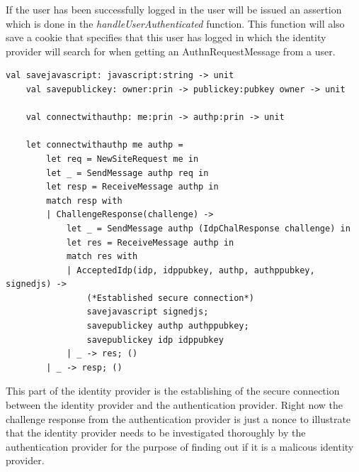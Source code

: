 \documentclass[twosided]{report}
\begin{document}
If the user has been successfully logged in the user will be issued an assertion which is done in the \emph{handleUserAuthenticated} function. This function will also save a cookie that specifies that this user has logged in which the identity provider will search for when getting an AuthnRequestMessage from a user.

\begin{lstlisting}[style=fstar, caption={Establising a secure connection with Authentication Provider}]
	val savejavascript: javascript:string -> unit
	val savepublickey: owner:prin -> publickey:pubkey owner -> unit

	val connectwithauthp: me:prin -> authp:prin -> unit

	let connectwithauthp me authp =
		let req = NewSiteRequest me in
		let _ = SendMessage authp req in
		let resp = ReceiveMessage authp in
		match resp with
		| ChallengeResponse(challenge) ->
			let _ = SendMessage authp (IdpChalResponse challenge) in
			let res = ReceiveMessage authp in
			match res with
			| AcceptedIdp(idp, idppubkey, authp, authppubkey, signedjs) ->
				(*Established secure connection*)
				savejavascript signedjs;
				savepublickey authp authppubkey;
				savepublickey idp idppubkey
			| _ -> res; ()
		| _ -> resp; ()
\end{lstlisting}

This part of the identity provider is the establishing of the secure connection between the identity provider and the authentication provider. Right now the challenge response from the authentication provider is just a nonce to illustrate that the identity provider needs to be investigated thoroughly by the authentication provider for the purpose of finding out if it is a malicous identity provider.

\clearpage
\end{document}
